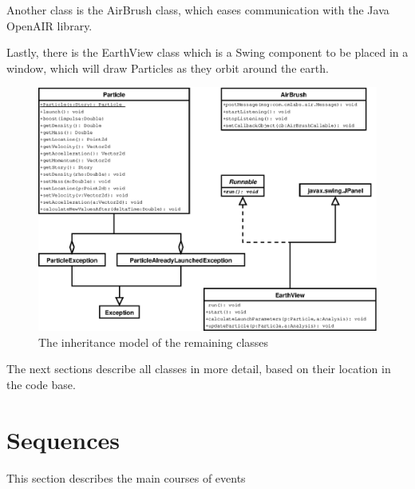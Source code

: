 Another class is the AirBrush class, which eases communication with the Java
OpenAIR library.

Lastly, there is the EarthView class which is a Swing component to be placed in
a window, which will draw Particles as they orbit around the earth.

\begin{figure}[htp]
  \centering
  \includegraphics{image/class-diagram}
  \caption{
    \label{fig:class-diagram}
    The inheritance model of the remaining classes}
\end{figure}

The next sections describe all classes in more detail, based on their location
in the code base.












\section{Sequences}

This section describes the main courses of events







